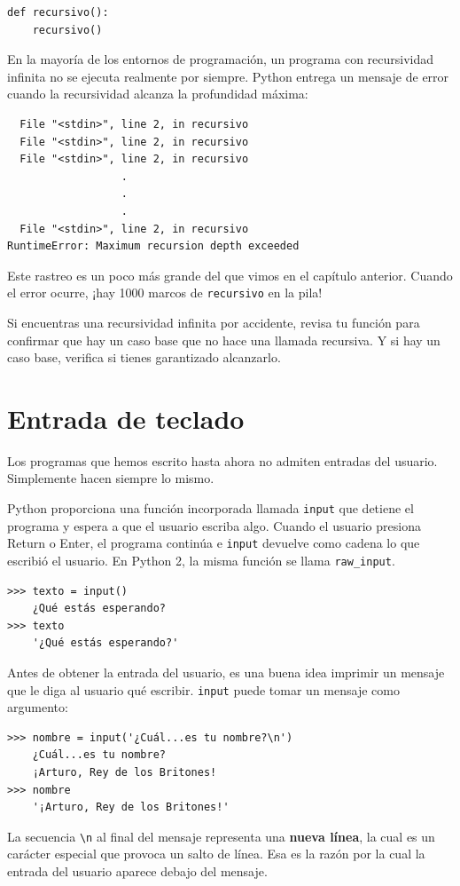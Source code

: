 \documentclass[10pt]{book}
\begin{document}
\begin{verbatim}
def recursivo():
    recursivo()
\end{verbatim}
%
En la mayoría de los entornos de programación, un programa con recursividad infinita
no se ejecuta realmente por siempre.  Python entrega un
mensaje de error cuando la recursividad alcanza la profundidad máxima:

\begin{verbatim}
  File "<stdin>", line 2, in recursivo
  File "<stdin>", line 2, in recursivo
  File "<stdin>", line 2, in recursivo
                  .
                  .
                  .
  File "<stdin>", line 2, in recursivo
RuntimeError: Maximum recursion depth exceeded
\end{verbatim}
%
Este rastreo es un poco más grande del que vimos en el
capítulo anterior.  Cuando el error ocurre, ¡hay 1000
marcos de {\tt recursivo} en la pila!

Si encuentras una recursividad infinita por accidente, revisa
tu función para confirmar que hay un caso base que no
hace una llamada recursiva.  Y si hay un caso base, verifica si
tienes garantizado alcanzarlo.


\section{Entrada de teclado}

Los programas que hemos escrito hasta ahora no admiten entradas del usuario.
Simplemente hacen siempre lo mismo.

Python proporciona una función incorporada llamada {\tt input} que
detiene el programa y
espera a que el usuario escriba algo.  Cuando el usuario presiona {\sf
  Return} o {\sf Enter}, el programa continúa e \verb"input"
devuelve como cadena lo que escribió el usuario.  En Python 2, la misma
función se llama \verb"raw_input".

\begin{verbatim}
>>> texto = input()
    ¿Qué estás esperando?
>>> texto
    '¿Qué estás esperando?'
\end{verbatim}
%
Antes de obtener la entrada del usuario, es una buena idea imprimir
un mensaje que le diga al usuario qué escribir.  \verb"input" puede tomar un
mensaje como argumento:

\begin{verbatim}
>>> nombre = input('¿Cuál...es tu nombre?\n')
    ¿Cuál...es tu nombre?
    ¡Arturo, Rey de los Britones!
>>> nombre
    '¡Arturo, Rey de los Britones!'
\end{verbatim}
%
La secuencia \verb"\n" al final del mensaje representa una {\bf
  nueva línea}, la cual es un carácter especial que provoca un salto de línea.
Esa es la razón por la cual la entrada del usuario aparece debajo del mensaje.  
\end{document}
